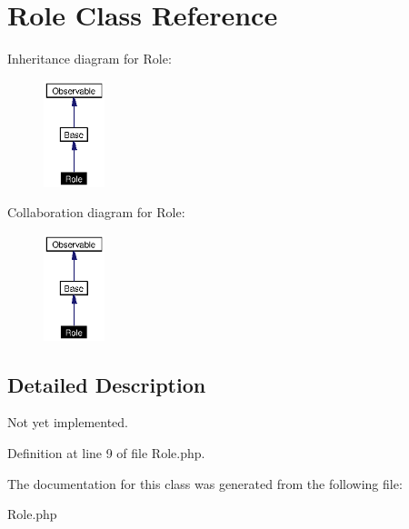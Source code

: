 \section{Role Class Reference}
\label{classRole}
Inheritance diagram for Role:\begin{figure}[H]
\begin{center}
\leavevmode
\includegraphics[width=50pt]{classRole__inherit__graph}
\end{center}
\end{figure}
Collaboration diagram for Role:\begin{figure}[H]
\begin{center}
\leavevmode
\includegraphics[width=50pt]{classRole__coll__graph}
\end{center}
\end{figure}


\subsection{Detailed Description}
Not yet implemented. 



Definition at line 9 of file Role.php.

The documentation for this class was generated from the following file:\begin{CompactItemize}
\item 
Role.php\end{CompactItemize}
